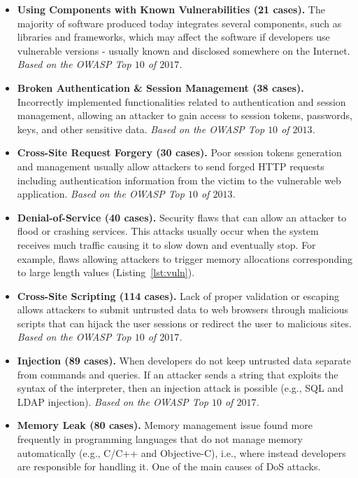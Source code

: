 \documentclass[10pt,conference]{IEEEtran}
\begin{document}
\begin{itemize}
    \item \textbf{Using Components with Known Vulnerabilities (21 cases).} The majority of
    software produced today integrates several components, such as libraries and
    frameworks, which may affect the software if developers use vulnerable
    versions - usually known and disclosed somewhere on the Internet.
    \textit{Based on the OWASP Top $10$ of $2017$.}

    \item \textbf{Broken Authentication \& Session Management (38 cases).} Incorrectly
    implemented functionalities related to authentication and session
    management, allowing an attacker to gain access to session tokens,
    passwords, keys, and other sensitive data. \textit{Based on the OWASP Top
    $10$ of $2013$.}

    \item \textbf{Cross-Site Request Forgery (30 cases).} Poor session tokens generation
    and management usually allow attackers to send forged HTTP requests
    including authentication information from the victim to the vulnerable web
    application. \textit{Based on the OWASP Top $10$ of $2013$.}

    \item \textbf{Denial-of-Service (40 cases).} Security flaws that can allow an attacker
    to flood or crashing services. This attacks usually occur when the system
    receives much traffic causing it to slow down and eventually stop. For
    example, flaws allowing attackers to trigger memory allocations
    corresponding to large length values (Listing~\ref{lst:vuln}).

    \item \textbf{Cross-Site Scripting (114 cases).} Lack of proper validation or escaping
    allows attackers to submit untrusted data to web browsers through malicious
    scripts that can hijack the user sessions or redirect the user to malicious
    sites. \textit{Based on the OWASP Top $10$ of $2017$.}

    \item \textbf{Injection (89 cases).} When developers do not keep untrusted data
    separate from commands and queries. If an attacker sends a string that
    exploits the syntax of the interpreter, then an injection attack is possible
    (e.g., SQL and LDAP injection). \textit{Based on the OWASP Top $10$ of
    $2017$.}

    \item \textbf{Memory Leak (80 cases).} Memory management issue found more frequently in
    programming languages that do not manage memory automatically (e.g., C/C++
    and Objective-C), i.e., where instead developers are responsible for
    handling it. One of the main causes of DoS attacks.


\end{itemize}
\end{document}
